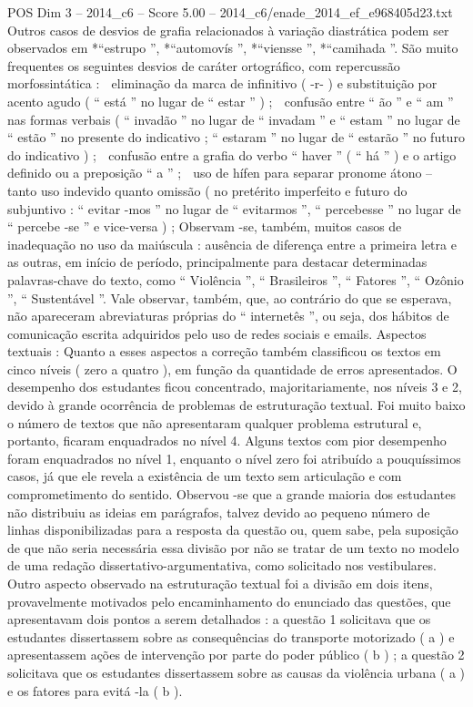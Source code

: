 \begin{textsample}{POS Dim 3 – 2014\_c6 – Score 5.00 – 2014\_c6/enade\_2014\_ef\_e968405d23.txt}
Outros casos de desvios de grafia relacionados à variação diastrática podem ser observados em *“estrupo ”, *“automovís ”, *“viensse ”, *“camihada ”.
São muito frequentes os seguintes desvios de caráter ortográfico, com repercussão morfossintática :  eliminação da marca de infinitivo ( -r- ) e substituição por acento agudo ( “ está ” no lugar de “ estar ” ) ;  confusão entre “ ão ” e “ am ” nas formas verbais ( “ invadão ” no lugar de “ invadam ” e “ estam ” no lugar de “ estão ” no presente do indicativo ; “ estaram ” no lugar de “ estarão ” no futuro do indicativo ) ;  confusão entre a grafia do verbo “ haver ” ( “ há ” ) e o artigo definido ou a preposição “ a ” ;  uso de hífen para separar pronome átono – tanto uso indevido quanto omissão ( no pretérito imperfeito e futuro do subjuntivo : “ evitar -mos ” no lugar de “ evitarmos ”, “ percebesse ” no lugar de “ percebe -se ” e vice-versa ) ; Observam -se, também, muitos casos de inadequação no uso da maiúscula : ausência de diferença entre a primeira letra e as outras, em início de período, principalmente para destacar determinadas palavras-chave do texto, como “ Violência ”, “ Brasileiros ”, “ Fatores ”, “ Ozônio ”, “ Sustentável ”.
Vale observar, também, que, ao contrário do que se esperava, não apareceram abreviaturas próprias do “ internetês ”, ou seja, dos hábitos de comunicação escrita adquiridos pelo uso de redes sociais e emails.
Aspectos textuais : Quanto a esses aspectos a correção também classificou os textos em cinco níveis ( zero a quatro ), em função da quantidade de erros apresentados.
O desempenho dos estudantes ficou concentrado, majoritariamente, nos níveis 3 e 2, devido à grande ocorrência de problemas de estruturação textual.
Foi muito baixo o número de textos que não apresentaram qualquer problema estrutural e, portanto, ficaram enquadrados no nível 4.
Alguns textos com pior desempenho foram enquadrados no nível 1, enquanto o nível zero foi atribuído a pouquíssimos casos, já que ele revela a existência de um texto sem articulação e com comprometimento do sentido.
Observou -se que a grande maioria dos estudantes não distribuiu as ideias em parágrafos, talvez devido ao pequeno número de linhas disponibilizadas para a resposta da questão ou, quem sabe, pela suposição de que não seria necessária essa divisão por não se tratar de um texto no modelo de uma redação dissertativo-argumentativa, como solicitado nos vestibulares.
Outro aspecto observado na estruturação textual foi a divisão em dois itens, provavelmente motivados pelo encaminhamento do enunciado das questões, que apresentavam dois pontos a serem detalhados : a questão 1 solicitava que os estudantes dissertassem sobre as consequências do transporte motorizado ( a ) e apresentassem ações de intervenção por parte do poder público ( b ) ; a questão 2 solicitava que os estudantes dissertassem sobre as causas da violência urbana ( a ) e os fatores para evitá -la ( b ).

\end{textsample}
